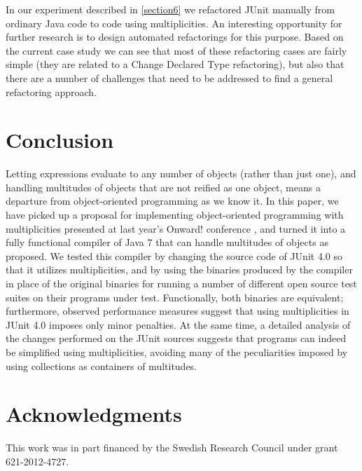 {\noindent In our experiment described in \autoref{section6} we refactored JUnit
manually from ordinary Java code to code using multiplicities. An
interesting opportunity for further research is to design automated
refactorings for this purpose. Based on the current case study we can see
that most of these refactoring cases are fairly simple (they are related to
a Change Declared Type refactoring), but also that there are a number of
challenges that need to be addressed to find a general refactoring approach.

\section{Conclusion}
\label{section9}

\noindent Letting expressions evaluate to any number of objects (rather than
just one), and handling multitudes of objects that are not reified as one
object, means a departure from object-oriented programming as we know it. In
this paper, we have picked up a proposal for implementing object-oriented
programming with multiplicities presented at last year's {Onward!} conference \cite{ref37},
and turned it into a fully functional compiler of Java 7 that can
handle multitudes of objects as proposed. We tested this compiler by
changing the source code of JUnit 4.0 so that it utilizes multiplicities,
and by using the binaries produced by the compiler in place of the original
binaries for running a number of different open source test suites on their
programs under test. Functionally, both binaries are equivalent;
furthermore, observed performance measures suggest that using multiplicities
in JUnit 4.0 imposes only minor penalties. At the same time, a detailed
analysis of the changes performed on the JUnit sources suggests that
programs can indeed be simplified using multiplicities, avoiding many of the
peculiarities imposed by using collections as containers of multitudes.

%

\section*{Acknowledgments}

This work was in part financed by the Swedish Research Council under grant 621-2012-4727.

{\raggedright
\printbibliography[segment=\therefsegment,heading=subbibliography]
}

}
